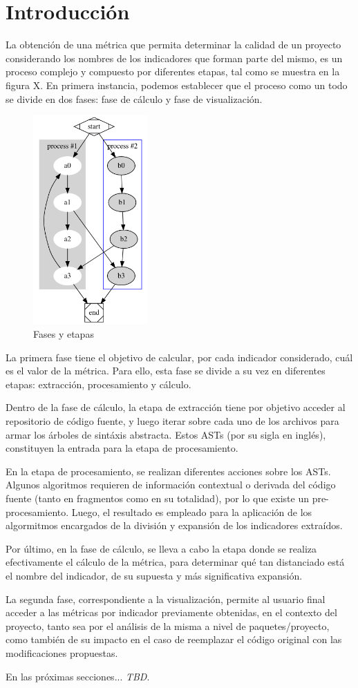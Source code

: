 \section{Introducción}

La obtención de una métrica que permita determinar la calidad de un proyecto considerando
los nombres de los indicadores que forman parte del mismo, es un proceso complejo y compuesto
por diferentes etapas, tal como se muestra en la figura X.
En primera instancia, podemos establecer que el proceso como un todo se divide en dos fases:
fase de cálculo y fase de visualización.

\begin{figure}[H]
    \includegraphics[height=8cm]{implementation/phases.png}
    \centering
    \caption{Fases y etapas}
  \end{figure}

La primera fase tiene el objetivo de calcular, por cada indicador considerado, cuál es el
valor de la métrica.
Para ello, esta fase se divide a su vez en diferentes etapas: extracción, procesamiento y
cálculo.

Dentro de la fase de cálculo, la etapa de extracción tiene por objetivo acceder al repositorio
de código fuente, y luego iterar sobre cada uno de los archivos para armar los árboles de sintáxis
abstracta.
Estos ASTs (por su sigla en inglés), constituyen la entrada para la etapa de procesamiento.

En la etapa de procesamiento, se realizan diferentes acciones sobre los ASTs.
Algunos algoritmos requieren de información contextual o derivada del código fuente (tanto en
fragmentos como en su totalidad), por lo que existe un pre-procesamiento.
Luego, el resultado es empleado para la aplicación de los algormitmos encargados de la división
y expansión de los indicadores extraídos.

Por último, en la fase de cálculo, se lleva a cabo la etapa donde se realiza efectivamente
el cálculo de la métrica, para determinar qué tan distanciado está el nombre del indicador,
de su supuesta y más significativa expansión.

La segunda fase, correspondiente a la visualización, permite al usuario final acceder
a las métricas por indicador previamente obtenidas, en el contexto del proyecto, tanto sea
por el análisis de la misma a nivel de paquetes/proyecto, como también de su impacto en
el caso de reemplazar el código original con las modificaciones propuestas.

En las próximas secciones... \textit{TBD}.
